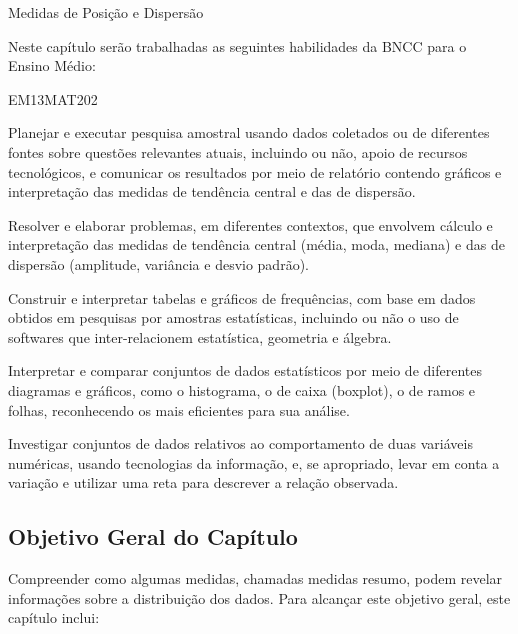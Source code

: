 \begin{apresentacao}{Medidas de Posição e Dispersão}

Neste capítulo serão trabalhadas as seguintes habilidades da BNCC para o Ensino Médio:

\begin{habilities}{EM13MAT202}

Planejar e executar pesquisa amostral usando dados coletados ou de diferentes fontes sobre questões relevantes atuais, incluindo ou não, apoio de recursos tecnológicos, e comunicar os resultados por meio de relatório contendo gráficos e interpretação das medidas de tendência central e das de dispersão.

 Resolver e elaborar problemas, em diferentes contextos, que envolvem cálculo e interpretação das medidas de tendência central (média, moda, mediana) e das de dispersão (amplitude, variância e desvio padrão).

 Construir e interpretar tabelas e gráficos de frequências, com base em dados obtidos em pesquisas por amostras estatísticas, incluindo ou não o uso de softwares que inter-relacionem estatística, geometria e álgebra.

 Interpretar e comparar conjuntos de dados estatísticos por meio de diferentes diagramas e gráficos, como o histograma, o de caixa (boxplot), o de ramos e folhas, reconhecendo os mais eficientes para sua análise.

 Investigar conjuntos de dados relativos ao comportamento de duas variáveis numéricas, usando tecnologias da informação, e, se apropriado, levar em conta a variação e utilizar uma reta para descrever a relação observada.
\end{habilities}

\subsection{Objetivo Geral do Capítulo}

Compreender como algumas medidas, chamadas medidas resumo, podem revelar informações sobre a distribuição dos dados. Para alcançar este objetivo geral, este capítulo inclui:


\end{apresentacao}
